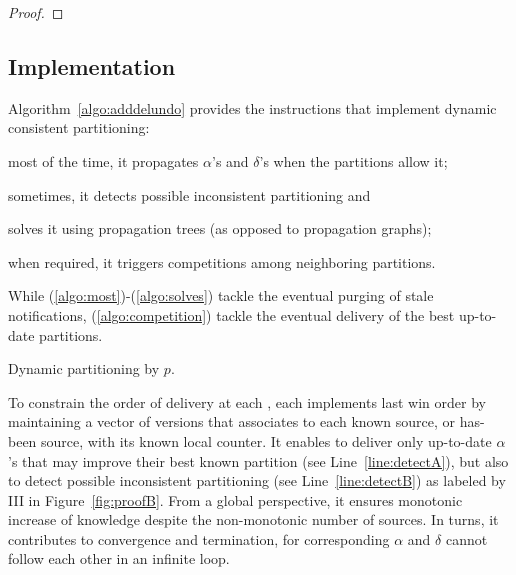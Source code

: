 \begin{theorem}
\end{theorem}

\begin{proof}
\end{proof}



\subsection{Implementation}

Algorithm~\ref{algo:adddelundo} provides the instructions that
implement dynamic consistent partitioning:
\begin{inparaenum}[(i)]
\item \label{algo:most} most of the time, it propagates $\alpha$'s and
  $\delta$'s when the partitions allow it;
\item \label{algo:sometimes} sometimes, it detects possible
  inconsistent partitioning and
\item \label{algo:solves}solves it using propagation trees (as opposed
  to propagation graphs);
\item \label{algo:competition} when required, it triggers competitions
  among neighboring partitions.
\end{inparaenum}
While (\ref{algo:most})-(\ref{algo:solves}) tackle the eventual purging of
stale notifications, (\ref{algo:competition}) tackle the eventual
delivery of the best up-to-date partitions.

\begin{algorithm}
  
  \caption{\label{algo:adddelundo}Dynamic partitioning by \Process $p$.}
\end{algorithm}

To constrain the order of delivery at each \process, each \process
implements last win order by maintaining a vector of versions that
associates to each known source, or has-been source, with its known
local counter. It enables \processes to deliver only up-to-date
$\alpha$'s that may improve their best known partition (see
Line~\ref{line:detectA}), but also to detect possible inconsistent
partitioning (see Line~\ref{line:detectB}) as labeled by III in
Figure~\ref{fig:proofB}. From a global perspective, it ensures
monotonic increase of knowledge despite the non-monotonic number of
sources. In turns, it contributes to convergence and termination, for
corresponding $\alpha$ and $\delta$ cannot follow each other in an
infinite loop.

